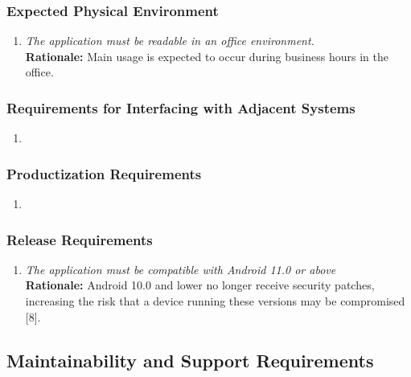 \documentclass[]{article}
\begin{document}
\begin{enumerate}[{\bf BE1.}]
\subsubsection{Expected Physical Environment}
\label{ssub:expected_physical_environment}
\begin{enumerate}[{OE-EPE}1. ]
    \item \emph{The application must be readable in an office environment. }\\
    {\bf Rationale:} Main usage is expected to occur during business hours in the office.
\end{enumerate}


\subsubsection{Requirements for Interfacing with Adjacent Systems}
\label{ssub:requirements_for_interfacing_with_adjacent_systems}
\begin{enumerate}[{N/A}]
    \item 
\end{enumerate}


\subsubsection{Productization Requirements}
\label{ssub:productization_requirements}
\begin{enumerate}[{N/A}]
    \item
\end{enumerate}


\subsubsection{Release Requirements}
\label{ssub:release_requirements}
\begin{enumerate}[{OE-R}1. ]
    \item \emph{The application must be compatible with Android 11.0 or above}\\
    {\bf Rationale:} Android 10.0 and lower no longer receive security patches, increasing the risk that a device running these versions may be compromised [8].
\end{enumerate}




\subsection{Maintainability and Support Requirements}
\label{sub:maintainability_and_support_requirements}



\end{enumerate}
\end{document}
